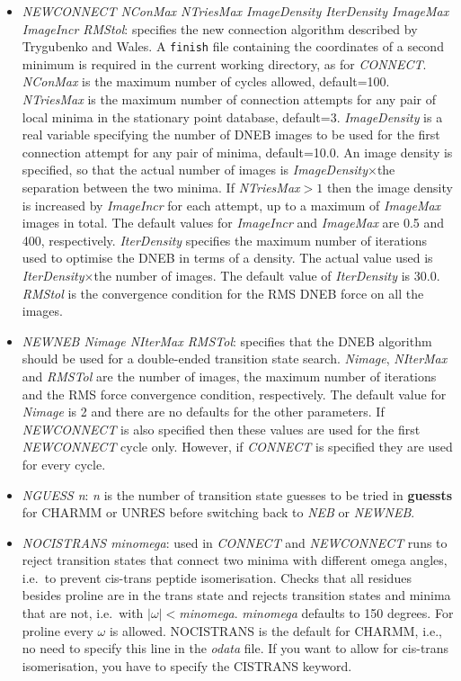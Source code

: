 \documentclass[12pt,a4paper,dvips]{article}
\begin{document}
\begin{itemize}
\item {\it NEWCONNECT NConMax NTriesMax ImageDensity IterDensity ImageMax ImageIncr RMStol\/}: 
specifies the new connection algorithm described by Trygubenko and Wales.\cite{TrygubenkoW04}
A {\tt finish} file containing the coordinates of a second minimum is required in the
current working directory, as for {\it CONNECT\/}.
{\it NConMax\/} is the maximum number of cycles allowed, default=100. 
{\it NTriesMax\/} is the maximum number of connection attempts for any pair of
local minima in the stationary point database, default=3. 
{\it ImageDensity\/} is a real variable specifying the number of DNEB images to be used for
the first connection attempt for any pair of minima, default=10.0. 
An image density is specified, so that the actual number of images is {\it ImageDensity\/}$\times$the
separation between the two minima.
If {\it NTriesMax}$>1$ then 
the image density is increased by {\it ImageIncr\/} for each attempt, up to
a maximum of {\it ImageMax\/} images in total. 
The default values for {\it ImageIncr\/} and {\it ImageMax\/} are 0.5 and 400, respectively.
{\it IterDensity\/} specifies the maximum number of iterations used to optimise the
DNEB in terms of a density. The actual value used is {\it IterDensity\/}$\times$the
number of images.
The default value of {\it IterDensity\/} is 30.0.
{\it RMStol\/} is the convergence condition for the RMS DNEB force on all the
images. 

\item {\it NEWNEB Nimage NIterMax RMSTol\/}:
specifies that the DNEB algorithm\cite{TrygubenkoW04} 
should be used for a double-ended transition state search.
{\it Nimage\/}, {\it NIterMax\/} and {\it RMSTol} are the number of images, the maximum
number of iterations and the RMS force convergence condition, respectively. 
The default value for {\it Nimage\/} is 2 and there are no defaults for the other parameters.
If {\it NEWCONNECT\/} is also specified then these values are used for the first {\it NEWCONNECT\/}
cycle only. However, if {\it CONNECT\/} is specified they are used for every cycle.

\item {\it NGUESS n\/}: {\it n\/} is the number of transition state guesses to be tried in 
{\bf guessts} for CHARMM or UNRES before switching back to {\it NEB\/} or {\it NEWNEB\/}.

\item {\it NOCISTRANS minomega\/}: used in {\it CONNECT\/}
and {\it NEWCONNECT} runs to reject transition states
that connect two minima with different omega angles, i.e.~to prevent cis-trans peptide
isomerisation. Checks that all residues besides proline are in the 
trans state and rejects transition states and minima that are not, 
i.e.~with $|\omega|<${\it minomega}. {\it minomega\/} defaults to 150 degrees. 
For proline every $\omega$ is allowed. NOCISTRANS is the default for
CHARMM, i.e., no need to specify this line in the {\it odata} file. If you
want to allow for cis-trans isomerisation, you have to specify the CISTRANS 
keyword.


\end{itemize}
\end{document}
